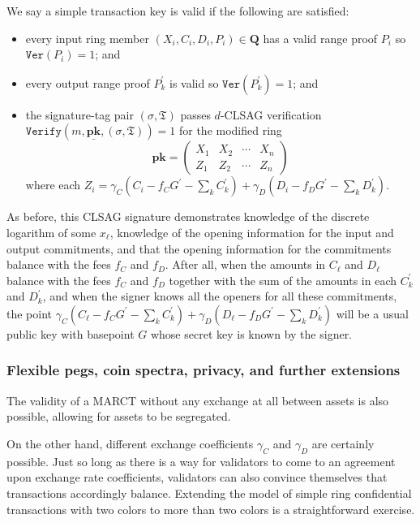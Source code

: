 \documentclass{article}
\theoremstyle{plain}
\theoremstyle{definition}
\begin{document}
We say a simple transaction key is valid if the following are satisfied:
\begin{itemize}
\item every input ring member $(X_i, C_i, D_i, P_i) \in \textbf{Q}$ has a valid range proof $P_i$ so $\texttt{Ver}(P_i) = 1$; and
\item every output range proof $P_k^\prime$ is valid so $\texttt{Ver}(P_k^\prime)=1$; and
\item the signature-tag pair $(\sigma, \mathfrak{T})$ passes $d$-CLSAG verification $\texttt{Verify}(m, \underline{\textbf{pk}}, (\sigma, \mathfrak{T})) = 1$ for the modified ring \[\textbf{pk} = \begin{pmatrix} X_1 & X_2 & \cdots & X_n \\ Z_1 & Z_2 & \cdots & Z_n\end{pmatrix}\] where each $Z_i = \gamma_C (C_i - f_C G^\prime - \sum_k C_k^\prime) + \gamma_D ( D_i - f_D G^\prime - \sum_k D_k^\prime)$.
\end{itemize}

As before, this CLSAG signature demonstrates knowledge of the discrete logarithm of some $x_\ell$, knowledge of the opening information for the input and output commitments, and that the opening information for the commitments balance with the fees $f_C$ and $f_D$.  After all, when the amounts in $C_\ell$ and $D_\ell$ balance with the fees $f_C$ and $f_D$ together with the sum of the amounts in each $C_k^\prime$ and $D_k^\prime$, and when the signer knows all the openers for all these commitments, the point $\gamma_C(C_\ell - f_C G^\prime - \sum_k C_k^\prime) + \gamma_D(D_\ell - f_D G^\prime - \sum_k D_k^\prime)$ will be a usual public key with basepoint $G$ whose secret key is known by the signer.


\subsubsection{Flexible pegs, coin spectra, privacy, and further extensions}

The validity of a MARCT without any exchange at all between assets is also possible, allowing for assets to be segregated. 

On the other hand, different exchange coefficients $\gamma_C$ and $\gamma_D$ are certainly possible.  Just so long as there is a way for validators to come to an agreement upon exchange rate coefficients, validators can also convince themselves that transactions accordingly balance. Extending the model of simple ring confidential transactions with two colors to more than two colors is a straightforward exercise.
\end{document}
